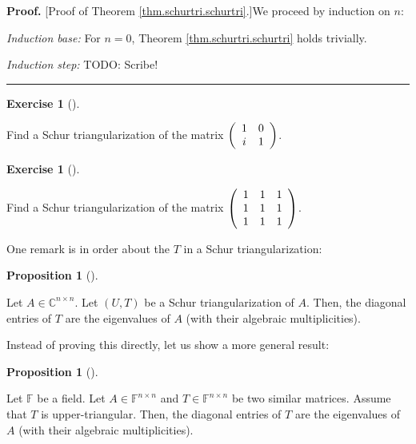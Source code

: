 \documentclass[numbers=enddot,12pt,final,onecolumn,notitlepage]{scrartcl}%
\newcounter{exer}
\numberwithin{exer}{subsection}
\theoremstyle{definition}
\newtheorem{prop}[theo]{Proposition}
\newenvironment{proposition}[1][]
{\begin{prop}[#1]\begin{leftbar}}
{\end{leftbar}\end{prop}}
\newtheorem{exmp}[exer]{Exercise}
\newenvironment{exercise}[1][]
{\begin{exmp}[#1]\begin{leftbar}}
{\end{leftbar}\end{exmp}}
\newenvironment{proof}[1][Proof]{\noindent\textbf{#1.} }{\ \rule{0.5em}{0.5em}}
\begin{document}
\begin{proof}
[Proof of Theorem \ref{thm.schurtri.schurtri}.]We proceed by induction on $n$:

\textit{Induction base:} For $n=0$, Theorem \ref{thm.schurtri.schurtri} holds trivially.

\textit{Induction step:} TODO: Scribe!
\end{proof}

\begin{exercise}
\label{exe.schurtri.schurtri.one2x2} Find a Schur triangularization of
the matrix $\left(
\begin{array}
[c]{cc}%
1 & 0\\
i & 1
\end{array}
\right)  $.
\end{exercise}

\begin{exercise}
\label{exe.schurtri.schurtri.one3x3} Find a Schur triangularization of
the matrix $\left(
\begin{array}
[c]{ccc}%
1 & 1 & 1\\
1 & 1 & 1\\
1 & 1 & 1
\end{array}
\right)  $.
\end{exercise}

One remark is in order about the $T$ in a Schur triangularization:

\begin{proposition}
\label{prop.schurtri.schurtri.T-diag}Let $A\in\mathbb{C}^{n\times n}$. Let
$\left(  U,T\right)  $ be a Schur triangularization of $A$. Then, the diagonal
entries of $T$ are the eigenvalues of $A$ (with their algebraic multiplicities).
\end{proposition}

Instead of proving this directly, let us show a more general result:

\begin{proposition}
\label{prop.schurtri.similar.T-diag}Let $\mathbb{F}$ be a field. Let
$A\in\mathbb{F}^{n\times n}$ and $T\in\mathbb{F}^{n\times n}$ be two similar
matrices. Assume that $T$ is upper-triangular. Then, the diagonal entries of
$T$ are the eigenvalues of $A$ (with their algebraic multiplicities).
\end{proposition}
\end{document}
